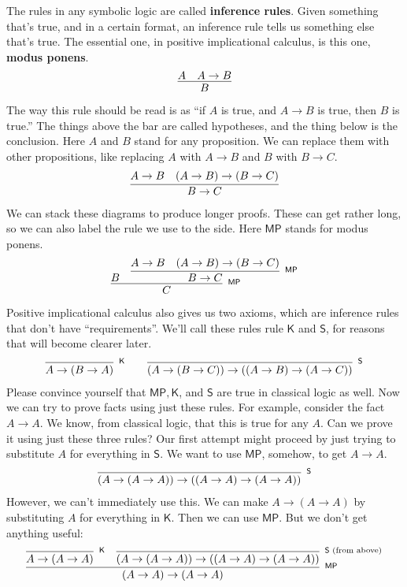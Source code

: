 \documentclass[11pt,paper=letter]{scrartcl}
\renewcommand{\sf}{\mathsf}
\begin{document}
The rules in any symbolic logic are called \textbf{inference rules}. Given something that's true, and in a certain format, an inference rule tells us something else that's true. The essential one, in positive implicational calculus, is this one, \textbf{modus ponens}.
\begin{align*}
\infer
{B}
{A & A \to B}
\end{align*}
The way this rule should be read is as ``if $A$ is true, and $A \to B$ is true, then $B$ is true.'' The things above the bar are called hypotheses, and the thing below is the conclusion. Here $A$ and $B$ stand for any proposition. We can replace them with other propositions, like replacing $A$ with $A \to B$ and $B$ with $B \to C$.
\begin{align*}
\infer
{B \to C}
{A \to B & (A \to B) \to (B \to C)}
\end{align*}
We can stack these diagrams to produce longer proofs. These can get rather long, so we can also label the rule we use to the side. Here $\sf{MP}$ stands for modus ponens.
\begin{align*}
\infer[^\sf{MP}]
{C}
{B &
\infer[^\sf{MP}]
{B \to C}
{A \to B & (A \to B) \to (B \to C)}}
\end{align*}
Positive implicational calculus also gives us two axioms, which are inference rules that don't have ``requirements''. We'll call these rules rule $\sf{K}$ and $\sf{S}$, for reasons that will become clearer later.
\begin{align*}
\infer[^\sf{K}]
{A \to (B \to A)}
{}
\qquad
\infer[^\sf{S}]
{(A \to (B \to C)) \to \left((A \to B) \to (A \to C)\right)}
{}
\end{align*}
Please convince yourself that $\sf{MP}, \sf{K}$, and $\sf{S}$ are true in classical logic as well. Now we can try to prove facts using just these rules. For example, consider the fact $A \to A$. We know, from classical logic, that this is true for any $A$. Can we prove it using just these three rules? Our first attempt might proceed by just trying to substitute $A$ for everything in $\sf{S}$. We want to use $\sf{MP}$, somehow, to get $A \to A$.
\begin{align*}
\infer[^\sf{S}]
{(A \to (A \to A)) \to \left((A \to A) \to (A \to A)\right)}
{}
\end{align*}
However, we can't immediately use this. We can make $A \to (A \to A)$ by substituting $A$ for everything in $\sf{K}$. Then we can use $\sf{MP}$. But we don't get anything useful:
\begin{align*}
\infer[^\sf{MP}]
{(A \to A) \to (A \to A)}
{
  \infer[^\sf{K}]
  {A \to (A \to A)}
  {}
  &
  \infer[^{\sf{S}\text{ (from above)}}]
  {(A \to (A \to A)) \to \left((A \to A) \to (A \to A)\right)}
  {}
}
\end{align*}
\end{document}
